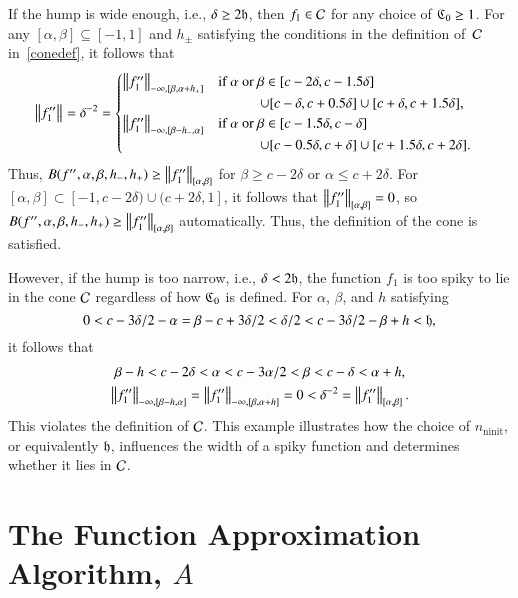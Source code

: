 \documentclass[review]{elsarticle}
\theoremstyle{definition}
\DeclareMathOperator{\ninit}{ninit}
\begin{document}
If the hump is wide enough, i.e., $\delta \ge 2 \fh$, then $f_1 \in \cc$ for any
choice of $\fC_0 \ge 1$. For any $[\alpha,\beta]\subseteq [-1,1]$ and
$h_{\pm}$ satisfying the conditions in the definition of~$\cc$ in~\eqref{conedef},
it follows that
\begin{align*}
    & \norm{f''_1} = \delta^{-2} =
\begin{cases}
\norm[-\infty,{[\beta,\alpha+h_+]}]{f''_1}  %
   & \text{if } \alpha\text{ or } \beta \in [c - 2\delta,  c - 1.5\delta]
\\ & \qquad\quad \cup [c - \delta,  c + 0.5\delta] \cup [c + \delta, c+1.5\delta],
\\ \norm[-\infty,{[\beta - h_-,\alpha]}]{f''_1} %
   & \text{if } \alpha\text{ or } \beta \in [c - 1.5\delta,  c - \delta]
\\ & \qquad\quad  \cup [c - 0.5 \delta,  c + \delta] \cup [c + 1.5\delta, c+2\delta].
\end{cases}
\end{align*}
Thus, $B(f'',\alpha,\beta,h_-,h_+)\ge\norm[{[\alpha,\beta]}]{f''_1}$ for $\beta
\ge c - 2\delta$ or $\alpha \le c + 2\delta$.
For $[\alpha,\beta] \subset [-1,c
- 2\delta) \cup (c+2\delta, 1]$, it follows that $\norm[{[\alpha,\beta]}]{f''_1} =
0$, so $B(f'',\alpha,\beta,h_-,h_+)\ge\norm[{[\alpha,\beta]}]{f''_1}$
automatically. Thus, the definition of the cone is satisfied.

However, if the hump is too narrow, i.e., $\delta < 2 \fh$, the function $f_1$
is too spiky to lie in the cone $\cc$ regardless of how $\fC_0$ is defined. For
$\alpha$, $\beta$, and $h$ satisfying
\[
0 < c - 3\delta/2 -\alpha =  \beta - c+ 3\delta/2 < \delta/2 < c-3\delta/2 - \beta + h < \fh,
\]
it follows that
\begin{gather*}
   \beta -  h < c - 2 \delta < \alpha < c - 3\alpha/2 < \beta < c - \delta < \alpha + h,
\\ \norm[-\infty,{[\beta - h,\alpha]}]{f''_1} =\norm[-\infty,{[\beta,\alpha+h]}]{f''_1}=0
< \delta^{-2} =\norm[{[\alpha,\beta]}]{f''_1}.
\end{gather*}
This violates the definition of $\cc$. This example illustrates how the choice
of $n_{\ninit}$, or equivalently $\fh$, influences the width of a spiky function and 
determines whether it lies in $\cc$.


\section{The Function Approximation Algorithm, $A$}\label{sec:fappx}
\end{document}
